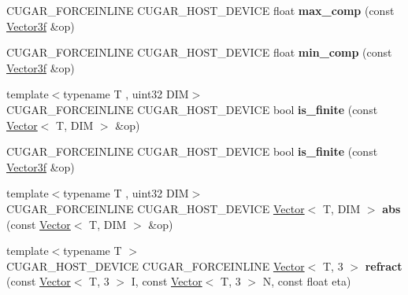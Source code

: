 \begin{DoxyCompactItemize}
\item 
\mbox{\label{namespacecugar_acb1723140aa02d77919fddfd2dcab1d7}} 
C\+U\+G\+A\+R\+\_\+\+F\+O\+R\+C\+E\+I\+N\+L\+I\+NE C\+U\+G\+A\+R\+\_\+\+H\+O\+S\+T\+\_\+\+D\+E\+V\+I\+CE float {\bfseries max\+\_\+comp} (const \hyperlink{structcugar_1_1_vector}{Vector3f} \&op)
\item 
\mbox{\label{namespacecugar_aca3d2f1da1b98ac1c5e1fe4b1d40c203}} 
C\+U\+G\+A\+R\+\_\+\+F\+O\+R\+C\+E\+I\+N\+L\+I\+NE C\+U\+G\+A\+R\+\_\+\+H\+O\+S\+T\+\_\+\+D\+E\+V\+I\+CE float {\bfseries min\+\_\+comp} (const \hyperlink{structcugar_1_1_vector}{Vector3f} \&op)
\item 
\mbox{\label{namespacecugar_ae389d22a8f4179179650fbb5ee54ea85}} 
{\footnotesize template$<$typename T , uint32 D\+IM$>$ }\\C\+U\+G\+A\+R\+\_\+\+F\+O\+R\+C\+E\+I\+N\+L\+I\+NE C\+U\+G\+A\+R\+\_\+\+H\+O\+S\+T\+\_\+\+D\+E\+V\+I\+CE bool {\bfseries is\+\_\+finite} (const \hyperlink{structcugar_1_1_vector}{Vector}$<$ T, D\+IM $>$ \&op)
\item 
\mbox{\label{namespacecugar_aa2c1ade55ec680e962854455f6656589}} 
C\+U\+G\+A\+R\+\_\+\+F\+O\+R\+C\+E\+I\+N\+L\+I\+NE C\+U\+G\+A\+R\+\_\+\+H\+O\+S\+T\+\_\+\+D\+E\+V\+I\+CE bool {\bfseries is\+\_\+finite} (const \hyperlink{structcugar_1_1_vector}{Vector3f} \&op)
\item 
\mbox{\label{namespacecugar_a521153f5c24cee5b8beb11c1da7c5055}} 
{\footnotesize template$<$typename T , uint32 D\+IM$>$ }\\C\+U\+G\+A\+R\+\_\+\+F\+O\+R\+C\+E\+I\+N\+L\+I\+NE C\+U\+G\+A\+R\+\_\+\+H\+O\+S\+T\+\_\+\+D\+E\+V\+I\+CE \hyperlink{structcugar_1_1_vector}{Vector}$<$ T, D\+IM $>$ {\bfseries abs} (const \hyperlink{structcugar_1_1_vector}{Vector}$<$ T, D\+IM $>$ \&op)
\item 
\mbox{\label{namespacecugar_a65582654c724bcbfec6b3d95340eb201}} 
{\footnotesize template$<$typename T $>$ }\\C\+U\+G\+A\+R\+\_\+\+H\+O\+S\+T\+\_\+\+D\+E\+V\+I\+CE C\+U\+G\+A\+R\+\_\+\+F\+O\+R\+C\+E\+I\+N\+L\+I\+NE \hyperlink{structcugar_1_1_vector}{Vector}$<$ T, 3 $>$ {\bfseries refract} (const \hyperlink{structcugar_1_1_vector}{Vector}$<$ T, 3 $>$ I, const \hyperlink{structcugar_1_1_vector}{Vector}$<$ T, 3 $>$ N, const float eta)

\end{DoxyCompactItemize}
